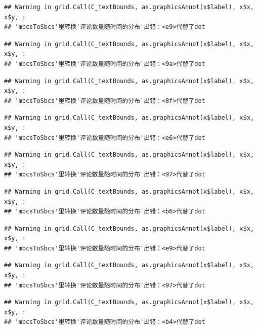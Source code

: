 \documentclass[
]{article}
\begin{document}
\begin{verbatim}
## Warning in grid.Call(C_textBounds, as.graphicsAnnot(x$label), x$x, x$y, :
## 'mbcsToSbcs'里转换'评论数量随时间的分布'出错：<e9>代替了dot
\end{verbatim}

\begin{verbatim}
## Warning in grid.Call(C_textBounds, as.graphicsAnnot(x$label), x$x, x$y, :
## 'mbcsToSbcs'里转换'评论数量随时间的分布'出错：<9a>代替了dot
\end{verbatim}

\begin{verbatim}
## Warning in grid.Call(C_textBounds, as.graphicsAnnot(x$label), x$x, x$y, :
## 'mbcsToSbcs'里转换'评论数量随时间的分布'出错：<8f>代替了dot
\end{verbatim}

\begin{verbatim}
## Warning in grid.Call(C_textBounds, as.graphicsAnnot(x$label), x$x, x$y, :
## 'mbcsToSbcs'里转换'评论数量随时间的分布'出错：<e6>代替了dot
\end{verbatim}

\begin{verbatim}
## Warning in grid.Call(C_textBounds, as.graphicsAnnot(x$label), x$x, x$y, :
## 'mbcsToSbcs'里转换'评论数量随时间的分布'出错：<97>代替了dot
\end{verbatim}

\begin{verbatim}
## Warning in grid.Call(C_textBounds, as.graphicsAnnot(x$label), x$x, x$y, :
## 'mbcsToSbcs'里转换'评论数量随时间的分布'出错：<b6>代替了dot
\end{verbatim}

\begin{verbatim}
## Warning in grid.Call(C_textBounds, as.graphicsAnnot(x$label), x$x, x$y, :
## 'mbcsToSbcs'里转换'评论数量随时间的分布'出错：<e9>代替了dot
\end{verbatim}

\begin{verbatim}
## Warning in grid.Call(C_textBounds, as.graphicsAnnot(x$label), x$x, x$y, :
## 'mbcsToSbcs'里转换'评论数量随时间的分布'出错：<97>代替了dot
\end{verbatim}

\begin{verbatim}
## Warning in grid.Call(C_textBounds, as.graphicsAnnot(x$label), x$x, x$y, :
## 'mbcsToSbcs'里转换'评论数量随时间的分布'出错：<b4>代替了dot
\end{verbatim}
\end{document}
